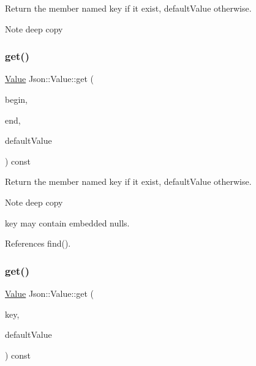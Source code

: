Return the member named key if it exist, default\+Value otherwise. \begin{DoxyNote}{Note}
deep copy 
\end{DoxyNote}
\mbox{\label{classJson_1_1Value_aa59ed050e87e1d58d93671a38687f36c_aa59ed050e87e1d58d93671a38687f36c}} 
\subsubsection{\texorpdfstring{get()}{get()}\hspace{0.1cm}{\footnotesize\ttfamily [3/4]}}
{\footnotesize\ttfamily \hyperlink{classJson_1_1Value}{Value} Json\+::\+Value\+::get (\begin{DoxyParamCaption}\item[{const char $\ast$}]{begin,  }\item[{const char $\ast$}]{end,  }\item[{const \hyperlink{classJson_1_1Value}{Value} \&}]{default\+Value }\end{DoxyParamCaption}) const}

Return the member named key if it exist, default\+Value otherwise. \begin{DoxyNote}{Note}
deep copy 

key may contain embedded nulls. 
\end{DoxyNote}


References find().

\mbox{\label{classJson_1_1Value_a7406e6af727c288bf8ab59945ece686a_a7406e6af727c288bf8ab59945ece686a}} 
\subsubsection{\texorpdfstring{get()}{get()}\hspace{0.1cm}{\footnotesize\ttfamily [4/4]}}
{\footnotesize\ttfamily \hyperlink{classJson_1_1Value}{Value} Json\+::\+Value\+::get (\begin{DoxyParamCaption}\item[{const \hyperlink{json_8h_a1e723f95759de062585bc4a8fd3fa4be_a1e723f95759de062585bc4a8fd3fa4be}{J\+S\+O\+N\+C\+P\+P\+\_\+\+S\+T\+R\+I\+NG} \&}]{key,  }\item[{const \hyperlink{classJson_1_1Value}{Value} \&}]{default\+Value }\end{DoxyParamCaption}) const}

